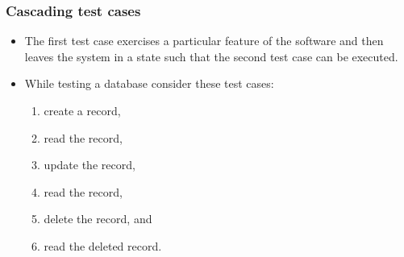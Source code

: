 \begin{frame}[hasprev=false,hasnext=false]
\label{example:cascading-test-case}
\frametitle{Cascading test cases}

\begin{itemize}
	\item The first test case exercises a particular feature of the software
	and then leaves the system in a state such that the second test case can
	be executed.

	\item While testing a database consider these test cases:
	\begin{enumerate}
		\item create a record,
		\item read the record,
		\item update the record,
		\item read the record,
		\item delete the record, and
		\item read the deleted record.
	\end{enumerate}
\end{itemize}

\end{frame}